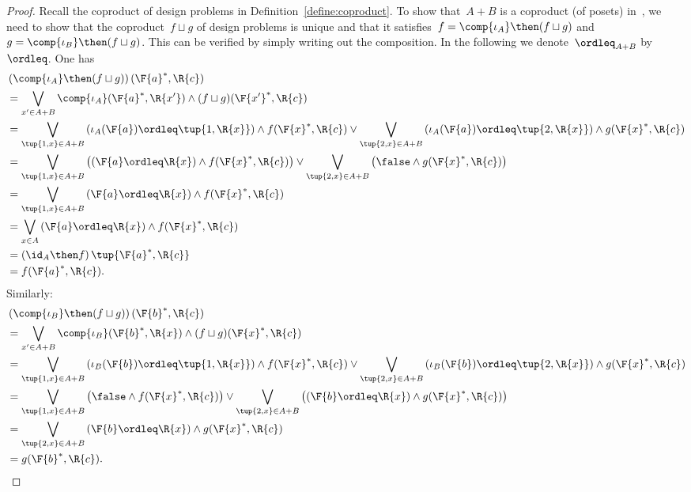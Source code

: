 \begin{proof}
  Recall the coproduct of design problems in Definition~\ref{define:coproduct}. To show that~$A+B$ is a coproduct (of posets) in~\DP, we need to show that the coproduct~$f \sqcup g$ of design problems is unique and that it satisfies~$f = \comp{\iota_A} \then (f \sqcup g)$ and~$g = \comp{\iota_B} \then (f \sqcup g)$. This can be verified by simply writing out the composition. In the following we denote~$\ordleq_{A+B}$ by $\ordleq$. One has
  \begin{equation}
    \begin{aligned}
      &\left(\comp{\iota_A}\then (f\sqcup g)\right)(\F{a}^*,\R{c})\\&=\bigvee_{x' \in A+B}\comp{\iota_A}(\F{a}^*,\R{x'})\wedge (f\sqcup g)(\F{x'}^*,\R{c})\\
      &=\bigvee_{\tup{1,x} \in A+B}
      \left(\iota_A(\F{a})\ordleq\tup{1,\R{x}}\right)\wedge  f(\F{x}^*,\R{c})  \vee \bigvee_{\tup{2,x} \in A+B}
      \left(\iota_A(\F{a})\ordleq \tup{2,\R{x}}\right)\wedge  g(\F{x}^*,\R{c})\\
      &=\bigvee_{\tup{1,x} \in A+B}
      \left( \left(\F{a}\ordleq \R{x}\right) \wedge  f(\F{x}^*,\R{c})\right) \vee \bigvee_{\tup{2,x} \in A+B}
      \left( \false \wedge  g(\F{x}^*,\R{c}) \right)\\
      &=\bigvee_{\tup{1,x} \in A+B} \left(\F{a}\ordleq \R{x}\right) \wedge  f(\F{x}^*,\R{c})\\
      &=\bigvee_{x\in A}\left( \F{a}\ordleq \R{x}\right) \wedge f(\F{x}^*,\R{c})\\
      &=\left( \id_A \then f\right)\tup{\F{a}^*,\R{c}}\\
      &=f(\F{a}^*,\R{c}).
    \end{aligned}
  \end{equation}
  Similarly:
  \begin{equation}
    \begin{aligned}
      &\left(\comp{\iota_B}\then (f\sqcup g)\right)(\F{b}^*,\R{c})\\&=\bigvee_{x' \in A+B}\comp{\iota_B}(\F{b}^*,\R{x})\wedge (f\sqcup g)(\F{x}^*,\R{c})\\
      &=\bigvee_{\tup{1,x} \in A+B}
      \left(\iota_B(\F{b})\ordleq\tup{1,\R{x}}\right)\wedge  f(\F{x}^*,\R{c})  \vee \bigvee_{\tup{2,x} \in A+B}
      \left(\iota_B(\F{b})\ordleq \tup{2,\R{x}}\right)\wedge  g(\F{x}^*,\R{c})\\
      &=\bigvee_{\tup{1,x} \in A+B}
      \left(\false \wedge  f(\F{x}^*,\R{c})\right) \vee \bigvee_{\tup{2,x} \in A+B}
      \left(\left(\F{b}\ordleq \R{x}\right) \wedge  g(\F{x}^*,\R{c}) \right)\\
      &=\bigvee_{\tup{2,x} \in A+B} \left(\F{b}\ordleq \R{x}\right) \wedge  g(\F{x}^*,\R{c})\\
      &=g(\F{b}^*,\R{c}).
    \end{aligned}
  \end{equation}


\end{proof}

